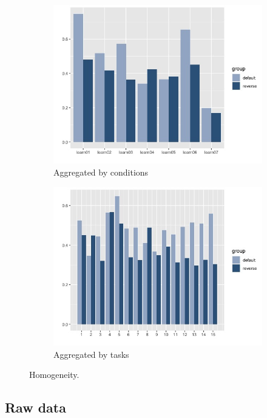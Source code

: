 \documentclass{article}
\begin{document}
\begin{figure}[h!]
  \begin{subfigure}[t]{0.45\textwidth}
    \centering
    \includegraphics[width=\linewidth]{var_cond} 
    \caption{Aggregated by conditions}
  \end{subfigure}
  \begin{subfigure}[t]{0.45\textwidth}
    \centering
    \includegraphics[width=\linewidth]{var_t} 
    \caption{Aggregated by tasks}
  \end{subfigure}
  \caption{Homogeneity.}
  \label{fig:var}
\end{figure}



\subsection*{Raw data}
\end{document}
